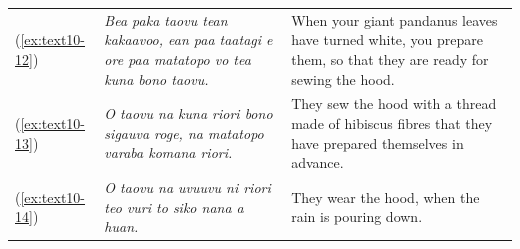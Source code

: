 \documentclass[output=paper]{langscibook}
\begin{document}
\begin{xltabular}{\textwidth}{lXX}
    (\ref{ex:text10-12})&\textit{Bea paka taovu tean kakaavoo, ean paa taatagi e ore paa matatopo vo tea kuna bono taovu.}&When your giant pandanus leaves have turned white, you prepare them, so that they are ready for sewing the hood.\\
    (\ref{ex:text10-13})&\textit{O taovu na kuna riori bono sigauva roge, na matatopo varaba komana riori.}&They sew the hood with a thread made of hibiscus fibres that they have prepared themselves in advance.\\
    (\ref{ex:text10-14})&\textit{O taovu na uvuuvu ni riori teo vuri to siko nana a huan.}&They wear the hood, when the rain is pouring down.\\
\end{xltabular}
\end{document}
